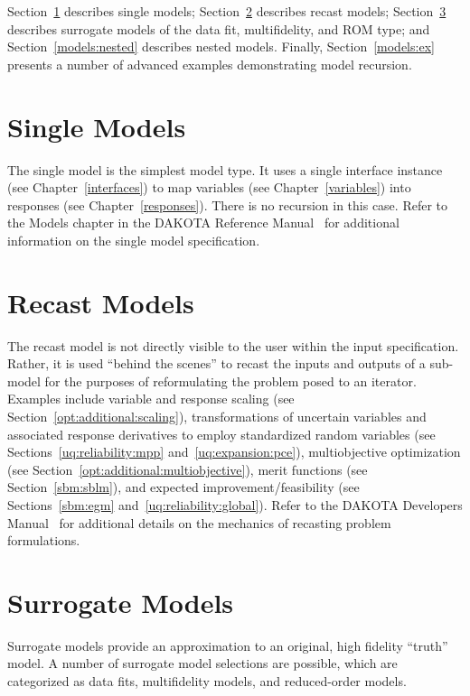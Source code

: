 Section~\ref{models:single} describes single models;
Section~\ref{models:recast} describes recast models;
Section~\ref{models:surrogate} describes surrogate models of the data
fit, multifidelity, and ROM type; and Section~\ref{models:nested}
describes nested models.  Finally, Section~\ref{models:ex} presents
a number of advanced examples demonstrating model recursion.

\section{Single Models}\label{models:single}

The single model is the simplest model type.  It uses a single
interface instance (see Chapter~\ref{interfaces}) to map variables
(see Chapter~\ref{variables}) into responses (see
Chapter~\ref{responses}).  There is no recursion in this case.  Refer
to the Models chapter in the DAKOTA Reference Manual~\cite{RefMan} for
additional information on the single model specification.

\section{Recast Models}\label{models:recast}

The recast model is not directly visible to the user within the input
specification.  Rather, it is used ``behind the scenes'' to recast the
inputs and outputs of a sub-model for the purposes of reformulating
the problem posed to an iterator.  Examples include variable and
response scaling (see Section~\ref{opt:additional:scaling}),
transformations of uncertain variables and associated response
derivatives to employ standardized random variables (see
Sections~\ref{uq:reliability:mpp} and~\ref{uq:expansion:pce}),
multiobjective optimization (see
Section~\ref{opt:additional:multiobjective}), merit functions (see
Section~\ref{sbm:sblm}), and expected improvement/feasibility (see
Sections~\ref{sbm:egm} and~\ref{uq:reliability:global}).  Refer to the
DAKOTA Developers Manual~\cite{DevMan} for additional details on the
mechanics of recasting problem formulations.

\section{Surrogate Models}\label{models:surrogate}

Surrogate models provide an approximation to an original, high
fidelity ``truth'' model.  A number of surrogate model selections are
possible, which are categorized as data fits, multifidelity models,
and reduced-order models.

